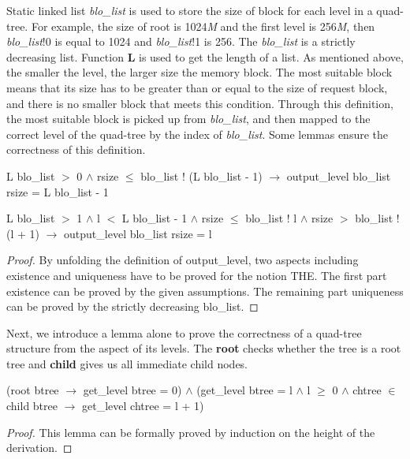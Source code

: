 Static linked list \emph{blo\_list} is used to store the size of block for each level in a quad-tree. For example, the size of root is 1024\emph{M} and the first level is 256\emph{M}, then \emph{blo\_list}!0 is equal to 1024 and \emph{blo\_list}!1 is 256. The \emph{blo\_list} is a strictly decreasing list. Function \textbf{L} is used to get the length of a list. As mentioned above, the smaller the level, the larger size the memory block. The most suitable block means that its size has to be greater than or equal to the size of request block, and there is no smaller block that meets this condition. Through this definition, the most suitable block is picked up from \emph{blo\_list}, and then mapped to the correct level of the quad-tree by the index of \emph{blo\_list}. Some lemmas ensure the correctness of this definition.

\begin{lemma}
L blo\_list $>$ 0 $\wedge$ rsize $\leq$ blo\_list ! (L blo\_list - 1) $\longrightarrow$ output\_level blo\_list rsize = L blo\_list - 1
\end{lemma}

\begin{lemma}
L blo\_list $>$ 1 $\wedge$ l $<$ L blo\_list - 1 $\wedge$ rsize $\leq$ blo\_list ! l $\wedge$ rsize $>$ blo\_list ! (l + 1) $\longrightarrow$ output\_level blo\_list rsize = l
\end{lemma}

\begin{proof}
By unfolding the definition of output\_level, two aspects including existence and uniqueness have to be proved for the notion THE. The first part existence can be proved by the given assumptions. The remaining part uniqueness can be proved by the strictly decreasing blo\_list.
\end{proof}

Next, we introduce a lemma alone to prove the correctness of a quad-tree structure from the aspect of its levels. The \textbf{root} checks whether the tree is a root tree and \textbf{child} gives us all immediate child nodes.

\begin{lemma}
(root btree $\longrightarrow$ get\_level btree = 0) $\wedge$ (get\_level btree = l $\wedge$ l $\geq$ 0 $\wedge$ chtree $\in$ child btree $\longrightarrow$ get\_level chtree = l + 1)
\end{lemma}

\begin{proof}
This lemma can be formally proved by induction on the height of the derivation.
\end{proof}

